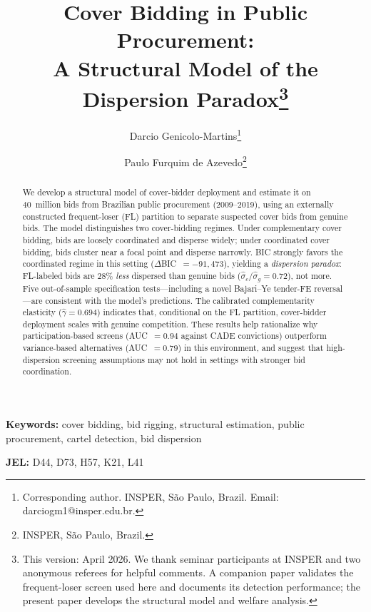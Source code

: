 \title{Cover Bidding in Public Procurement:\\ A Structural Model of the Dispersion Paradox\thanks{This version: April 2026. We thank seminar participants at INSPER and two anonymous referees for helpful comments. A companion paper \citep{genicolomartins2026screening} validates the frequent-loser screen used here and documents its detection performance; the present paper develops the structural model and welfare analysis.}}

\author{Darcio Genicolo-Martins\thanks{Corresponding author. INSPER, S\~ao Paulo, Brazil. Email: darciogm1@insper.edu.br.} \and Paulo Furquim de Azevedo\thanks{INSPER, S\~ao Paulo, Brazil.}}

\date{}

\maketitle

\begin{abstract}
\noindent We develop a structural model of cover-bidder deployment and
estimate it on 40~million bids from Brazilian public procurement
(2009--2019), using an externally constructed frequent-loser (FL)
partition to separate suspected cover bids from genuine bids. The
model distinguishes two cover-bidding regimes. Under complementary
cover bidding, bids are loosely coordinated and disperse widely;
under coordinated cover bidding, bids cluster near a focal point and
disperse narrowly. BIC strongly favors the coordinated regime in this
setting ($\Delta$BIC~$= -91{,}473$), yielding a \emph{dispersion
paradox}: FL-labeled bids are 28\% \emph{less} dispersed than genuine
bids ($\hat{\sigma}_c / \hat{\sigma}_g = 0.72$), not more. Five
out-of-sample specification tests---including a novel Bajari--Ye
tender-FE reversal---are consistent with the model's predictions.
The calibrated complementarity elasticity ($\hat{\gamma} = 0.694$)
indicates that, conditional on the FL partition, cover-bidder
deployment scales with genuine competition. These results help
rationalize why participation-based screens (AUC~$= 0.94$ against
CADE convictions) outperform variance-based alternatives
(AUC~$= 0.79$) in this environment, and suggest that
high-dispersion screening assumptions may not hold in settings with
stronger bid coordination.
\end{abstract}

\medskip

\noindent\textbf{Keywords:} cover bidding, bid rigging, structural estimation, public procurement, cartel detection, bid dispersion

\noindent\textbf{JEL:} D44, D73, H57, K21, L41

\bigskip
